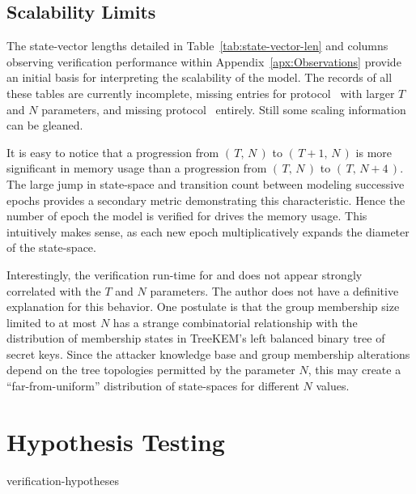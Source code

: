 \hypertarget{sec:scalability-limits}{%
\subsection{Scalability Limits}\label{sec:scalability-limits}}

The state-vector lengths detailed in Table\ \ref{tab:state-vector-len} and columns observing verification performance within Appendix\ \ref{apx:Observations} provide an initial basis for interpreting the scalability of the  model.
The records of all these tables are currently incomplete, missing entries for protocol \VersionOne\ with larger \(T\) and \(N\) parameters, and missing protocol \VersionTwo\ entirely.
Still some scaling information can be gleaned.

It is easy to notice that a progression from \( (\,T,\, N\,) \) to \( (\,T+1,\, N\,) \) is more significant in memory usage than a progression from \( (\,T,\, N\,) \) to \( (\,T,\, N+4\,) \).
The large jump in state-space and transition count between modeling successive epochs provides a secondary metric demonstrating this characteristic.
Hence the number of epoch the model is verified for drives the memory usage.
This intuitively makes sense, as each new epoch multiplicatively expands the diameter of the state-space.

Interestingly, the verification run-time for  and  does not appear strongly correlated with the \(T\) and \(N\) parameters.
The author does not have a definitive explanation for this behavior.
One postulate is that the group membership size limited to at most \(N\) has a strange combinatorial relationship with the distribution of membership states in TreeKEM's left balanced binary tree of secret keys.
Since the attacker knowledge base and group membership alterations depend on the tree topologies permitted by the parameter \(N\), this may create a ``far-from-uniform'' distribution of state-spaces for different \(N\) values.


\hypertarget{sec:hypothesis-outcomes}{%
\section{Hypothesis Testing}\label{sec:hypothesis-outcomes}}

\begin{table}[ht!]                                                                                                                      
\caption{%
\label{tab:verification-hypotheses}%
Verification Hypotheses of .
}%
{verification-hypotheses}
\end{table}

